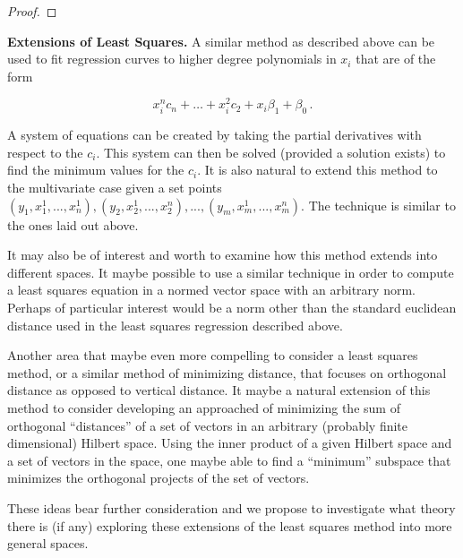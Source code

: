 \documentclass[a4paper]{article}
\newcommand{\tab} {\hspace{5mm}}
\numberwithin{equation}{section}
\begin{document}
\begin{description}
\begin{proof}
\end{proof}

\item \textbf{Extensions of Least Squares.}
\tab A similar method as described above can be used to fit regression curves to higher degree polynomials in $x_i$ that are of the form

$$x_i^nc_n + \dots + x_i^2c_2 + x_i\beta_1 + \beta_0\,.$$

A system of equations can be created by taking the partial derivatives with respect to the $c_i$. This system can then be solved (provided a solution exists) to find the minimum values for the $c_i$. It is also natural to extend this method to the multivariate case given a set points $(y_1,x_1^1,...,x_n^1),(y_2,x_2^1,...,x_2^n),...,(y_m,x_m^1,...,x_m^n)$. The technique is similar to the ones laid out above.

\tab It may also be of interest and worth to examine how this method extends into different spaces. It maybe possible to use a similar technique in order to compute a least squares equation in a normed vector space with an arbitrary norm. Perhaps of particular interest would be a norm other than the standard euclidean distance used in the least squares regression described above.

\tab Another area that maybe even more compelling to consider a least squares method, or a similar method of minimizing distance, that focuses on orthogonal distance as opposed to vertical distance. It maybe a natural extension of this method to consider developing an approached of minimizing the sum of orthogonal ``distances'' of a set of vectors in an arbitrary (probably finite dimensional) Hilbert space. Using the inner product of a given Hilbert space and a set of vectors in the space, one maybe able to find a ``minimum'' subspace that minimizes the orthogonal projects of the set of vectors.

\tab These ideas bear further consideration and we propose to investigate what theory there is (if any) exploring these extensions of the least squares method into more general spaces.

\end{description}
\end{document}
